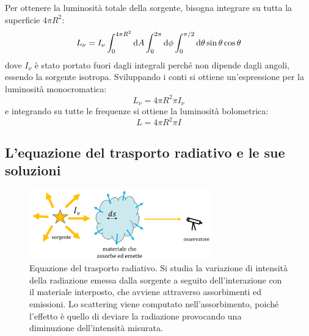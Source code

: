 Per ottenere la luminosità totale della sorgente, bisogna integrare su tutta la superficie $4\pi R^2$:
\[
    L_\nu = I_\nu \int_0^{4\pi R^2} \mathop{\mathrm{{}d}}\mathopen{} A \int_0^{2\pi} \mathop{\mathrm{{}d}}\mathopen{} \phi \int_0^{\pi/2} \mathop{\mathrm{{}d}}\mathopen{} \theta \sin{\theta} \cos{\theta}
\]
dove $I_\nu$ è stato portato fuori dagli integrali perché non dipende dagli angoli, essendo la sorgente isotropa. Sviluppando i conti si ottiene un'espressione per la luminosità monocromatica:
\begin{equation}\label{eq:luminosità-monocromatica-intensità}
    L_\nu = 4 \pi R^2 \pi I_\nu
\end{equation}
e integrando su tutte le frequenze si ottiene la luminosità bolometrica:
\begin{equation}\label{eq:luminosità-intensità}
    L = 4 \pi R^2 \pi I
\end{equation}

\subsection{L'equazione del trasporto radiativo e le sue soluzioni}\label{sec:trasporto-radiativo}\label{sec:soluzioni-trasporto-radiativo}

\begin{figure}
\centering
\includegraphics[width=0.7\textwidth]{immagini/trasporto-radiativo.png}
\caption{Equazione del trasporto radiativo. Si studia la variazione di intensità della radiazione emessa dalla sorgente a seguito dell'interazione con il materiale interposto, che avviene attraverso assorbimenti ed emissioni. Lo scattering viene computato nell'assorbimento, poiché l'effetto è quello di deviare la radiazione provocando una diminuzione dell'intensità misurata.}
\label{fig:trasporto-radiativo}
\end{figure}


